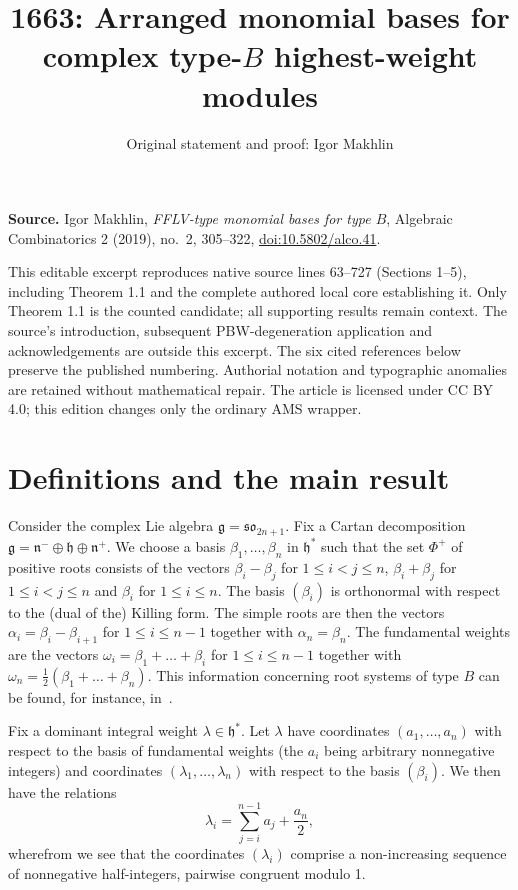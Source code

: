 \documentclass[10pt,a4paper]{article}
\title{1663: Arranged monomial bases for complex type-$B$ highest-weight modules}
\author{Original statement and proof: Igor Makhlin}
\date{}
\theoremstyle{remark}\newtheorem{rema}[theo]{Remark}
\newcommand{\la}{\lambda}
\begin{document}
\maketitle
\noindent\textbf{Source.} Igor Makhlin, \emph{FFLV-type monomial bases for type $B$},
Algebraic Combinatorics 2 (2019), no.~2, 305--322,
\href{https://doi.org/10.5802/alco.41}{doi:10.5802/alco.41}.
\par\noindent This editable excerpt reproduces native source lines 63--727 (Sections 1--5),
including Theorem 1.1 and the complete authored local core establishing it.
Only Theorem 1.1 is the counted candidate; all supporting results remain context.
The source's introduction, subsequent PBW-degeneration application and acknowledgements
are outside this excerpt. The six cited references below preserve the published numbering.
Authorial notation and typographic anomalies are retained without mathematical repair.
The article is licensed under CC BY 4.0; this edition changes only the ordinary AMS wrapper.
\par\medskip
\section{Definitions and the main result}\label{defsec}

Consider the complex Lie algebra $\mathfrak{g}=\mathfrak{so}_{2n+1}$. Fix a Cartan decomposition $\mathfrak g=\mathfrak n^-\oplus\mathfrak h\oplus\mathfrak n^+$. We choose a basis $\beta_1,\dots,\beta_n$ in $\mathfrak h^*$ such that the set $\Phi^+$ of positive roots consists of the vectors $\beta_i-\beta_j$ for $1\le i<j\le n$, $\beta_i+\beta_j$ for $1\le i<j\le n$ and $\beta_i$ for $1\le i\le n$. The basis $(\beta_i)$ is orthonormal with respect to the (dual of the) Killing form. The simple roots are then the vectors $\alpha_i=\beta_i-\beta_{i+1}$ for $1\le i\le n-1$ together with $\alpha_n=\beta_n$. The fundamental weights are the vectors $\omega_i=\beta_1+\dots+\beta_i$ for $1\le i\le n-1$ together with $\omega_n=\frac12(\beta_1+\dots+\beta_n)$. This information concerning root systems of type $B$ can be found, for instance, in~\cite{carter}.

Fix a dominant integral weight $\lambda\in\mathfrak h^*$. Let $\lambda$ have coordinates $(a_1,\dots,a_n)$ with respect to the basis of fundamental weights (the $a_i$ being arbitrary nonnegative integers) and coordinates $(\la_1,\dots,\la_n)$ with respect to the basis $(\beta_i)$. We then have the relations
\[
\lambda_i=\sum_{j=i}^{n-1}a_j+\frac{a_n}2,
\]
wherefrom we see that the coordinates $(\la_i)$ comprise a non-increasing sequence of nonnegative half-integers, pairwise congruent modulo 1.
\end{document}
